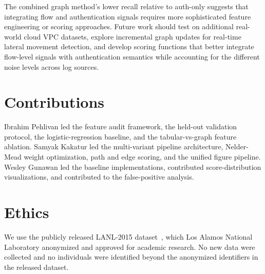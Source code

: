 \documentclass[letterpaper,twocolumn,10pt]{article}
\begin{document}
The combined graph method's lower recall relative to auth-only suggests that integrating flow and authentication signals requires more sophisticated feature engineering or scoring approaches. Future work should test on additional real-world cloud VPC datasets, explore incremental graph updates for real-time lateral movement detection, and develop scoring functions that better integrate flow-level signals with authentication semantics while accounting for the different noise levels across log sources.

\section*{Contributions}


Ibrahim Pehlivan led the feature audit framework, the held-out validation protocol, the logistic-regression baseline, and the tabular-vs-graph feature ablation. Samyak Kakatur led the multi-variant pipeline architecture, Nelder-Mead weight optimization, path and edge scoring, and the unified figure pipeline. Wesley Gunawan led the baseline implementations, contributed score-distribution visualizations, and contributed to the false-positive analysis. 



\section*{Ethics}
We use the publicly released LANL-2015 dataset~\cite{kent-2015-cyberdata1}, which Los Alamos National Laboratory anonymized and approved for academic research. No new data were collected and no individuals were identified beyond the anonymized identifiers in the released dataset.

{\footnotesize 
}
\end{document}

